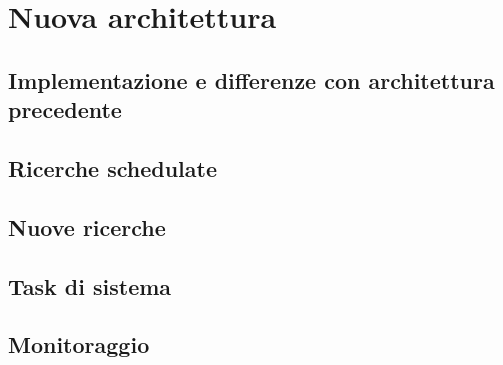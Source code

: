 \chapter{Nuova architettura}
\label{cha:nuova_architettura}

\section{Implementazione e differenze con architettura precedente}
\label{sec:implementazione_differenze}

\lipsum[1]

\section{Ricerche schedulate}
\label{sec:schedulate}

\lipsum[1]

\section{Nuove ricerche}
\label{sec:nuove}

\lipsum[1]

\section{Task di sistema}
\label{sec:sistema}

\lipsum[1]

\section{Monitoraggio}
\label{sec:monitoraggio}

\lipsum[1]
